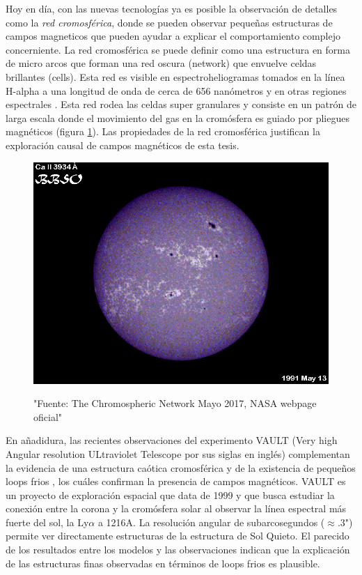 \documentclass[9pt]{book}
\begin{document}
Hoy en d\'ia, con las nuevas tecnolog\'ias ya es posible la observaci\'on de detalles como la \emph{red cromosf\'erica}, donde se pueden observar peque\~nas estructuras de campos magneticos que pueden ayudar a explicar el comportamiento complejo concerniente.
La red cromosf\'erica se puede definir como una estructura en forma de micro arcos que forman una red oscura (network) que envuelve celdas brillantes (cells). Esta red es visible en espectroheliogramas tomados en la l\'inea H-alpha a una longitud de onda de cerca de 656 nan\'ometros y en otras regiones espectrales \cite{NASAweb}. Esta red rodea las celdas super granulares y consiste en un patr\'on de larga escala donde el movimiento del gas en la crom\'osfera es guiado por pliegues magn\'eticos (figura \ref{fig:chromosphericnet}). Las propiedades de la red cromosf\'erica justifican la exploraci\'on causal de campos magn\'eticos de esta tesis.

\begin{figure}[h]
\caption{"Fuente: The Chromospheric Network Mayo 2017, NASA webpage oficial"}
\centering
\includegraphics[scale=0.3]{CAII3934}
\label{fig:chromosphericnet}
\end{figure}


En a\~nadidura, las recientes observaciones del experimento VAULT (Very high Angular resolution ULtraviolet Telescope por sus siglas en ingl\'es) complementan la evidencia de una estructura ca\'otica cromosf\'erica y de la existencia de peque\~nos loops frios \cite{VAULT1}, los cu\'ales confirman la presencia de campos magn\'eticos.
VAULT es un proyecto de exploraci\'on espacial que data de 1999 y que busca estudiar la conexi\'on entre la corona y la crom\'osfera solar al observar la l\'inea espectral m\'as fuerte del sol, la Ly$\alpha$ a 1216A.
La resoluci\'on angular de subarcosegundos ($\approx$.3") permite ver directamente estructuras de la estructura de Sol Quieto. El parecido de los resultados entre los modelos y las observaciones indican que la explicaci\'on de las estructuras finas observadas en t\'erminos de loops frios es plausible.
\end{document}
